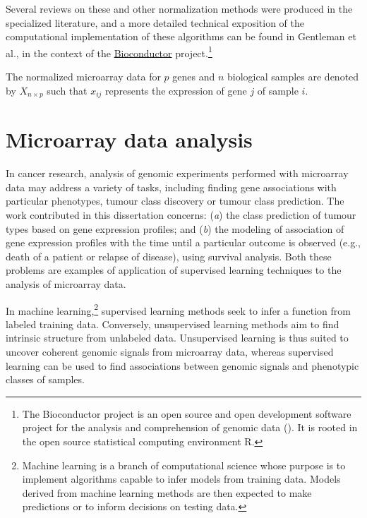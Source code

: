 Several reviews on these and other normalization methods were produced in the
specialized
literature,\cite{ploner_correlation_2005,bolstad_comparison_2003,harr_comparison_2006}
and a more detailed technical exposition of the computational implementation of
these algorithms can be found in Gentleman et
al.,\cite{gentleman_bioinformatics_2006} in the context of the
\href{http://www.bioconductor.org/}{\textsf{Bioconductor}} project.\footnote{The
  Bioconductor project is an open source and open development software project
  for the analysis and comprehension of genomic data
  (\citealp{gentleman_bioconductor:_2004}).  It is rooted in the open source
  statistical computing environment \textsf{R}.}

\medskip

The normalized microarray data for $p$ genes and $n$ biological samples are
denoted by $X_{n \times p}$ such that $x_{ij}$ represents the expression of gene
$j$ of sample $i$.

\section{Microarray data analysis}
\label{sec:microarray-methods-data-analysis}


In cancer research, analysis of genomic experiments performed with
 microarray data may address a variety of tasks, including
finding gene associations with particular phenotypes, tumour class discovery or
tumour class prediction.  The work contributed in this dissertation concerns:
(\emph{a}) the class prediction of tumour types based on gene expression
profiles; and (\emph{b}) the modeling of association of gene expression profiles
with the time until a particular outcome is observed (e.g., death of a patient
or relapse of disease), using survival analysis.  Both these problems are
examples of application of supervised learning techniques to the analysis of
microarray data.

In machine learning,\footnote{Machine learning is a branch of computational
  science whose purpose is to implement algorithms capable to infer models from
  training data.  Models derived from machine learning methods are then expected
  to make predictions or to inform decisions on testing data.} supervised
learning methods seek to infer a function from labeled training data.
Conversely, unsupervised learning methods aim to find intrinsic structure from
unlabeled data.\cite{webb_statistical_2003} Unsupervised learning is thus suited
to uncover coherent genomic signals from microarray data, whereas supervised
learning can be used to find associations between genomic signals and phenotypic
classes of samples.

